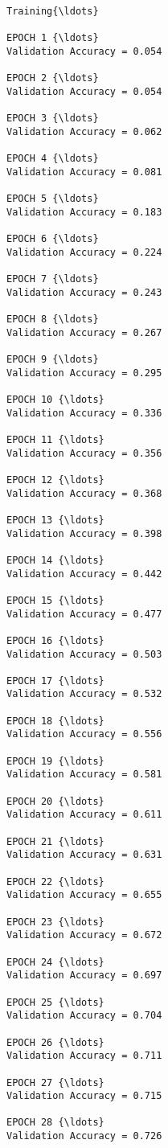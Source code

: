 \documentclass[11pt]{article}
\begin{document}
    \begin{Verbatim}[commandchars=\\\{\}]
Training{\ldots}

EPOCH 1 {\ldots}
Validation Accuracy = 0.054

EPOCH 2 {\ldots}
Validation Accuracy = 0.054

EPOCH 3 {\ldots}
Validation Accuracy = 0.062

EPOCH 4 {\ldots}
Validation Accuracy = 0.081

EPOCH 5 {\ldots}
Validation Accuracy = 0.183

EPOCH 6 {\ldots}
Validation Accuracy = 0.224

EPOCH 7 {\ldots}
Validation Accuracy = 0.243

EPOCH 8 {\ldots}
Validation Accuracy = 0.267

EPOCH 9 {\ldots}
Validation Accuracy = 0.295

EPOCH 10 {\ldots}
Validation Accuracy = 0.336

EPOCH 11 {\ldots}
Validation Accuracy = 0.356

EPOCH 12 {\ldots}
Validation Accuracy = 0.368

EPOCH 13 {\ldots}
Validation Accuracy = 0.398

EPOCH 14 {\ldots}
Validation Accuracy = 0.442

EPOCH 15 {\ldots}
Validation Accuracy = 0.477

EPOCH 16 {\ldots}
Validation Accuracy = 0.503

EPOCH 17 {\ldots}
Validation Accuracy = 0.532

EPOCH 18 {\ldots}
Validation Accuracy = 0.556

EPOCH 19 {\ldots}
Validation Accuracy = 0.581

EPOCH 20 {\ldots}
Validation Accuracy = 0.611

EPOCH 21 {\ldots}
Validation Accuracy = 0.631

EPOCH 22 {\ldots}
Validation Accuracy = 0.655

EPOCH 23 {\ldots}
Validation Accuracy = 0.672

EPOCH 24 {\ldots}
Validation Accuracy = 0.697

EPOCH 25 {\ldots}
Validation Accuracy = 0.704

EPOCH 26 {\ldots}
Validation Accuracy = 0.711

EPOCH 27 {\ldots}
Validation Accuracy = 0.715

EPOCH 28 {\ldots}
Validation Accuracy = 0.726


\end{Verbatim}
\end{document}
